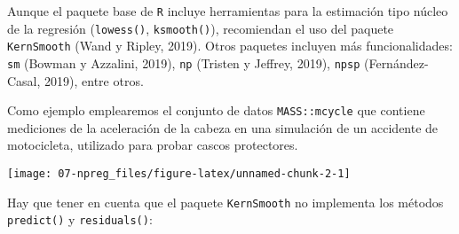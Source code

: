 \documentclass[
]{book}
\newenvironment{Shaded}{\begin{snugshade}}{\end{snugshade}}
\newcommand{\AttributeTok}[1]{\textcolor[rgb]{0.77,0.63,0.00}{#1}}
\newcommand{\CommentTok}[1]{\textcolor[rgb]{0.56,0.35,0.01}{\textit{#1}}}
\newcommand{\FunctionTok}[1]{\textcolor[rgb]{0.00,0.00,0.00}{#1}}
\newcommand{\NormalTok}[1]{#1}
\newcommand{\OtherTok}[1]{\textcolor[rgb]{0.56,0.35,0.01}{#1}}
\newcommand{\SpecialCharTok}[1]{\textcolor[rgb]{0.00,0.00,0.00}{#1}}
\newcommand{\StringTok}[1]{\textcolor[rgb]{0.31,0.60,0.02}{#1}}
\theoremstyle{break}
\theoremstyle{definition}
\theoremstyle{definition}
\theoremstyle{definition}
\theoremstyle{definition}
\theoremstyle{remark}
\begin{document}
Aunque el paquete base de \texttt{R} incluye herramientas para la estimación
tipo núcleo de la regresión (\texttt{lowess()}, \texttt{ksmooth()}), recomiendan
el uso del paquete \texttt{KernSmooth} (Wand y Ripley, 2019).
Otros paquetes incluyen más funcionalidades: \texttt{sm} (Bowman y Azzalini, 2019),
\texttt{np} (Tristen y Jeffrey, 2019), \texttt{npsp} (Fernández-Casal, 2019), entre otros.

Como ejemplo emplearemos el conjunto de datos \texttt{MASS::mcycle} que contiene mediciones
de la aceleración de la cabeza en una simulación de un accidente de motocicleta,
utilizado para probar cascos protectores.

\begin{Shaded}
\end{Shaded}

\begin{center}\texttt{[image: 07-npreg\_files/figure-latex/unnamed-chunk-2-1]} \end{center}

Hay que tener en cuenta que el paquete \texttt{KernSmooth} no implementa los métodos
\texttt{predict()} y \texttt{residuals()}:

\begin{Shaded}
\end{Shaded}
\end{document}
